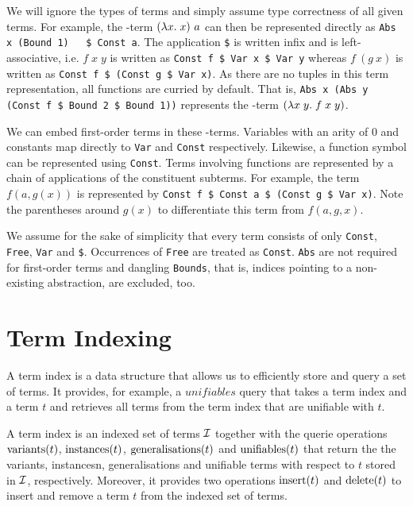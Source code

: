 We will ignore the types of terms and simply assume type correctness of all given terms. For example, the \lam -term $(\lambda x.\;x)\ a$ can then be represented directly as \lstinline{Abs x (Bound 1)   $ Const a}. The application \lstinline{$} is written infix and is left-associative, i.e. $f\;x\;y$ is written as \lstinline{Const f $ Var x $ Var y} whereas $f\ (g\ x)$ is written as \lstinline{Const f $ (Const g $ Var x)}. As there are no tuples in this term representation, all functions are curried by default. That is, \lstinline{Abs x (Abs y (Const f $ Bound 2 $ Bound 1))} represents the \lam -term $(\lambda x\;y.\;f\;x\;y)$.

We can embed first-order terms in these \lam -terms. Variables with an arity of $0$ and constants map directly to \lstinline{Var} and \lstinline{Const} respectively. Likewise, a function symbol can be represented using \lstinline{Const}. Terms involving functions are represented by a chain of applications of the constituent subterms. For example, the term $f(a,g(x))$ is represented by \lstinline{Const f $ Const a $ (Const g $ Var x)}. Note the parentheses around $g(x)$ to differentiate this term from $f(a,g,x)$.

We assume for the sake of simplicity that every term consists of only \lstinline{Const}, \lstinline{Free}, \lstinline{Var} and \lstinline{$}. Occurrences of \lstinline{Free} are treated as \lstinline{Const}. \lstinline{Abs} are not required for first-order terms and dangling \lstinline{Bounds}, that is, indices pointing to a non-existing abstraction, are excluded, too.

\section{Term Indexing} \label{termindex}
  A term index is a data structure that allows us to efficiently store and query a set of terms. It provides, for example, a $unifiables$ query that takes a term index and a term $t$ and retrieves all terms from the term index that are unifiable with $t$.
\begin{defn}
  A term index is an indexed set of terms $\mathcal{I}$ together with the querie operations $\mathrm{variants} (t)$, $\mathrm{instances} (t)$, $\mathrm{generalisations} (t)$ and $\mathrm{unifiables} (t)$ that return the the variants, instancesn, generalisations and unifiable terms with respect to $t$ stored in $\mathcal{I}$, respectively. Moreover, it provides two operations $\mathrm{insert} (t)$ and $\mathrm{delete} (t)$ to insert and remove a term $t$ from the indexed set of terms.
\end{defn}


